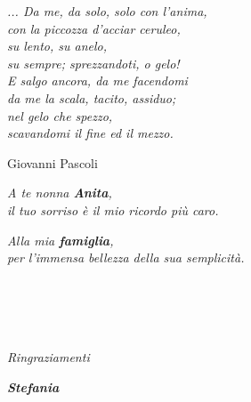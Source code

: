 
\cleardoublepage %

\thispagestyle{empty}%
%
\setlength{\hoffset}{-1in}
\setlength{\voffset}{-1in}

\setlength{\textheight}{211mm}
\setlength{\textwidth}{138mm}

\setlength{\evensidemargin}{32mm}
\setlength{\oddsidemargin}{41mm}
\setlength{\marginparwidth}{0mm}
\setlength{\marginparsep}{0mm}

\setlength{\topmargin}{10mm}
\setlength{\headheight}{5mm}
\setlength{\headsep}{26mm}

\setlength{\footskip}{32mm}
\begin{center}
{\itshape ... Da me, da solo, solo con l'anima,\\ con la piccozza d'acciar ceruleo, \\su lento, su anelo, \\su sempre; sprezzandoti, o gelo! \\
E salgo ancora, da me facendomi \\da me la scala, tacito, assiduo; \\nel gelo che spezzo,\\ scavandomi il fine ed il mezzo. \\
\par Giovanni Pascoli}
\end{center}


\newpage %
\thispagestyle{empty} %
\cleardoublepage %



\begin{flushright}
{\itshape A te nonna {\bfseries Anita}, \\
il tuo sorriso è il mio ricordo più caro.}

\vspace {5mm}
{\itshape Alla mia  {\bfseries famiglia}, \\
per l'immensa bellezza della sua semplicità.}

\end{flushright}

\vspace{6mm}

\noindent
\\\\
\\\\
{\itshape 
Ringraziamenti} 
\begin{flushright}
{\itshape \bfseries Stefania}
\end{flushright}


\newpage %
\thispagestyle{empty} %
\cleardoublepage %




